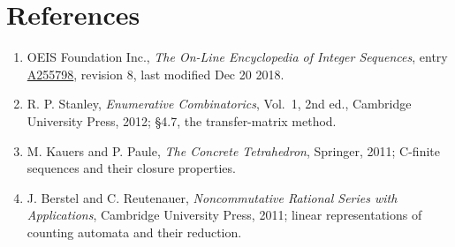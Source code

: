 \documentclass[11pt]{article}
\theoremstyle{definition}
\begin{document}
\section{References}

\begin{enumerate}

\item OEIS Foundation Inc., \emph{The On-Line Encyclopedia of Integer Sequences}, entry \href{https://oeis.org/A255798}{A255798}, revision 8, last modified Dec 20 2018.

\item R. P. Stanley, \emph{Enumerative Combinatorics}, Vol.~1, 2nd ed., Cambridge University Press, 2012; \S4.7, the transfer-matrix method.

\item M. Kauers and P. Paule, \emph{The Concrete Tetrahedron}, Springer, 2011; C-finite sequences and their closure properties.

\item J. Berstel and C. Reutenauer, \emph{Noncommutative Rational Series with Applications}, Cambridge University Press, 2011; linear representations of counting automata and their reduction.

\end{enumerate}
\end{document}

